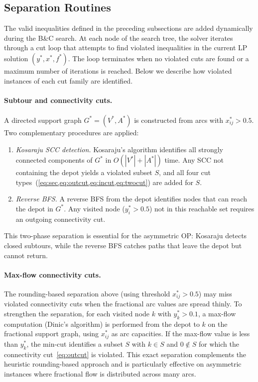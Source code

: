 \documentclass[preprint,11pt]{elsarticle}
\begin{document}
\subsection{Separation Routines}
\label{sec:separation}

The valid inequalities defined in the preceding subsections are added dynamically during the B\&C search.
At each node of the search tree, the solver iterates through a cut loop that attempts to find violated inequalities in the current LP solution $(y^*, x^*, f^*)$.
The loop terminates when no violated cuts are found or a maximum number of iterations is reached.
Below we describe how violated instances of each cut family are identified.

\paragraph{Subtour and connectivity cuts.}
A directed support graph $G^* = (V^*, A^*)$ is constructed from arcs with $x_{ij}^* > 0.5$.
Two complementary procedures are applied:
\begin{enumerate}[nosep]
  \item \emph{Kosaraju SCC detection.}
        Kosaraju's algorithm identifies all strongly connected components of $G^*$ in $O(|V^*| + |A^*|)$ time.
        Any SCC not containing the depot yields a violated subset $S$, and all four cut types~(\cref{eq:sec,eq:outcut,eq:incut,eq:twocut}) are added for $S$.
  \item \emph{Reverse BFS.}
        A reverse BFS from the depot identifies nodes that can reach the depot in $G^*$.
        Any visited node ($y_i^* > 0.5$) not in this reachable set requires an outgoing connectivity cut.
\end{enumerate}
This two-phase separation is essential for the asymmetric OP\@: Kosaraju detects closed subtours, while the reverse BFS catches paths that leave the depot but cannot return.

\paragraph{Max-flow connectivity cuts.}
The rounding-based separation above (using threshold $x_{ij}^* > 0.5$) may miss violated connectivity cuts when the fractional arc values are spread thinly.
To strengthen the separation, for each visited node $k$ with $y_k^* > 0.1$, a max-flow computation (Dinic's algorithm) is performed from the depot to $k$ on the fractional support graph, using $x_{ij}^*$ as arc capacities.
If the max-flow value is less than $y_k^*$, the min-cut identifies a subset $S$ with $k \in S$ and $0 \notin S$ for which the connectivity cut~\eqref{eq:outcut} is violated.
This exact separation complements the heuristic rounding-based approach and is particularly effective on asymmetric instances where fractional flow is distributed across many arcs.
\end{document}
